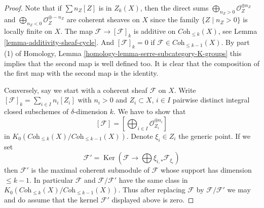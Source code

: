 \documentclass[10pt,a4paper]{amsart}
\theoremstyle{plain}
\theoremstyle{definition}
\theoremstyle{remark}
\numberwithin{equation}{subsection}
\def\Ker{\mathop{\mathrm{Ker}}}
\begin{document}
\begin{proof}
Note that if $\sum n_Z[Z]$ is in $Z_k(X)$, then
the direct sums
$\bigoplus\nolimits_{n_Z > 0} \mathcal{O}_Z^{\oplus n_Z}$ and
$\bigoplus\nolimits_{n_Z < 0} \mathcal{O}_Z^{\oplus -n_Z}$
are coherent sheaves on $X$ since the family $\{Z \mid n_Z > 0\}$
is locally finite on $X$.
The map $\mathcal{F} \to [\mathcal{F}]_k$ is additive
on $\textit{Coh}_{\leq k}(X)$, see
Lemma \ref{lemma-additivity-sheaf-cycle}. And $[\mathcal{F}]_k = 0$
if $\mathcal{F} \in \textit{Coh}_{\leq k - 1}(X)$. By part (1)
of Homology, Lemma \ref{homology-lemma-serre-subcategory-K-groups}
this implies that the second map is well defined too.
It is clear that the composition of the first map with the second
map is the identity.

\medskip\noindent
Conversely, say we start with a coherent sheaf $\mathcal{F}$
on $X$. Write $[\mathcal{F}]_k = \sum_{i \in I} n_i[Z_i]$
with $n_i > 0$ and $Z_i \subset X$, $i \in I$
pairwise distinct integral closed subschemes of $\delta$-dimension $k$.
We have to show that
$$
[\mathcal{F}] = [\bigoplus\nolimits_{i \in I} \mathcal{O}_{Z_i}^{\oplus n_i}]
$$
in $K_0(\textit{Coh}_{\leq k}(X)/\textit{Coh}_{\leq k - 1}(X))$.
Denote $\xi_i \in Z_i$ the generic point.
If we set
$$
\mathcal{F}' = \Ker(\mathcal{F} \to \bigoplus \xi_{i, *}\mathcal{F}_{\xi_i})
$$
then $\mathcal{F}'$ is the maximal coherent submodule of $\mathcal{F}$
whose support has dimension $\leq k - 1$. In particular $\mathcal{F}$
and $\mathcal{F}/\mathcal{F}'$ have the same class in
$K_0(\textit{Coh}_{\leq k}(X)/\textit{Coh}_{\leq k - 1}(X))$.
Thus after replacing $\mathcal{F}$ by $\mathcal{F}/\mathcal{F}'$
we may and do assume that the kernel $\mathcal{F}'$ displayed
above is zero.


\end{proof}
\end{document}
